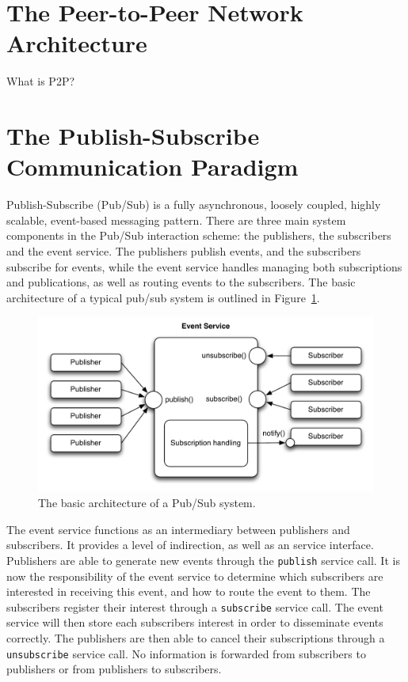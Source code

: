 \section{The Peer-to-Peer Network Architecture}
What is P2P?\

\section{The Publish-Subscribe Communication Paradigm}

Publish-Subscribe (Pub/Sub) is a fully asynchronous, loosely coupled,
highly scalable, event-based messaging pattern. There are three main
system components in the Pub/Sub interaction scheme: the publishers, the
subscribers and the event service. The publishers publish events, and
the subscribers subscribe for events, while the event service handles
managing both subscriptions and publications, as well as routing events
to the subscribers. The basic architecture of a typical pub/sub system
is outlined in Figure~\ref{fig:pubsubarch}.

\begin{figure}
\centering
\includegraphics[width=\textwidth]{figures/pubsubarch}
\caption{The basic architecture of a Pub/Sub system.}
\label{fig:pubsubarch}
\end{figure}

The event service functions as an intermediary between publishers and
subscribers. It provides a level of indirection, as well as an service
interface. Publishers are able to generate new events through the
\texttt{publish} service call. It is now the responsibility of the
event service to determine which subscribers are interested in receiving
this event, and how to route the event to them. The subscribers register
their interest through a \texttt{subscribe} service call. The event
service will then store each subscribers interest in order to
disseminate events correctly. The publishers are then able to cancel
their subscriptions through a \texttt{unsubscribe} service call. No
information is forwarded from subscribers to publishers or from
publishers to subscribers.

